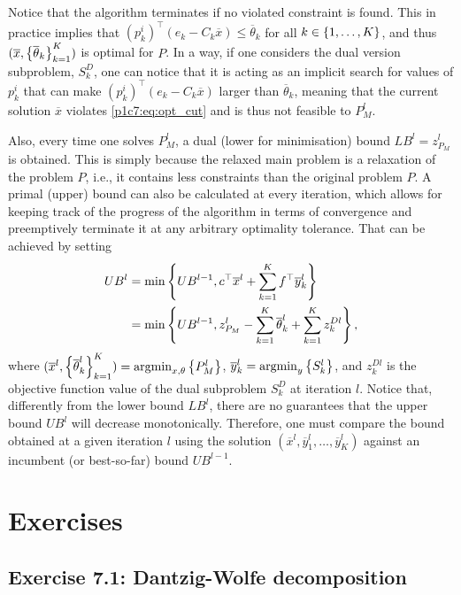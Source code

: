Notice that the algorithm terminates if no violated constraint is found. This in practice implies that $(p^i_k)^\top(e_k - C_k \overline{x}) \leq \overline{\theta}_k$ for all $k \in \left\{ 1,\dots,K \right \}$, and thus $(\overline{x}, \left\{ \overline{\theta}_k \right \}_{k=1}^K)$ is optimal for $P$. In a way, if one considers the dual version subproblem, $S_k^D$, one can notice that it is acting as an implicit search for values of $p^i_k$ that can make $(p^i_k)^\top(e_k - C_k \overline{x})$ larger than $\overline{\theta}_k$, meaning that the current solution $\overline{x}$ violates \eqref{p1c7:eq:opt_cut} and is thus not feasible to $P_M^l$. 

Also, every time one solves $P_M^l$, a dual (lower for minimisation) bound $LB^l = z_{P_M}^l$ is obtained. This is simply because the relaxed main problem is a relaxation of the problem $P$, i.e., it contains less constraints than the original problem $P$. A primal (upper) bound can also be calculated at every iteration, which allows for keeping track of the progress of the algorithm in terms of convergence and preemptively terminate it at any arbitrary optimality tolerance. That can be achieved by setting
%
\begin{align*}
	UB^l &= \min\left\{ UB^{l-1}, c^\top \overline{x}^l + \sum_{k=1}^K f^\top \overline{y}_k^l \right \} \\	
	&= \min\left\{ UB^{l-1}, z_{P_M}^l - \sum_{k=1}^K \overline{\theta}_k^l + \sum_{k=1}^K z^{Dl}_{k} \right \},
\end{align*}
%
where $(\overline{x}^l, \left\{ \overline{\theta}^{l}_k \right \}_{k=1}^K) = \mathop{\rm argmin}_{x, \theta} \left\{ P_M^l \right \}$, $\overline{y}_k^l = \mathop{\rm argmin}_y \left\{ S_k^l \right \}$, and $z^{Dl}_{k}$ is the objective function value of the dual subproblem $S_k^D$ at iteration $l$. Notice that, differently from the lower bound $LB^l$, there are no guarantees that the upper bound $UB^l$ will decrease monotonically. Therefore, one must compare the bound obtained at a given iteration $l$ using the solution $(\overline{x}^l, \overline{y}_1^l,\dots, \overline{y}^l_K)$ against an incumbent (or best-so-far) bound $UB^{l-1}$.

\vfill 

\pagebreak	

\section{Exercises}

\subsection*{Exercise 7.1: Dantzig-Wolfe decomposition}


